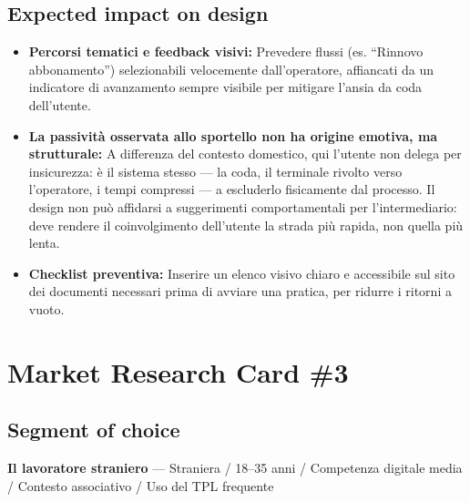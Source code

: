\documentclass[11pt,a4paper]{article}
\begin{document}
\subsection*{Expected impact on design}
\begin{tcolorbox}[colback=backgroundColor,colframe=borderColor,arc=2mm]

\begin{itemize}[leftmargin=*,itemsep=6pt]

     \item \textbf{Percorsi tematici e feedback visivi:} Prevedere flussi (es. ``Rinnovo abbonamento'') selezionabili velocemente dall'operatore, affiancati da un indicatore di avanzamento sempre visibile per mitigare l'ansia da coda dell'utente.

    \item \textbf{La passività osservata allo sportello non ha origine 
    emotiva, ma strutturale:} A differenza del contesto domestico, 
    qui l'utente non delega per insicurezza: è il sistema stesso --- la 
    coda, il terminale rivolto verso l'operatore, i tempi compressi --- 
    a escluderlo fisicamente dal processo. Il design non può affidarsi 
    a suggerimenti comportamentali per l'intermediario: deve rendere 
    il coinvolgimento dell'utente la strada più rapida, non quella più 
    lenta.

     \item \textbf{Checklist preventiva:} Inserire un elenco visivo chiaro e accessibile sul sito dei documenti necessari prima di avviare una pratica, per ridurre i ritorni a vuoto.

\end{itemize}
\end{tcolorbox}

\newpage
\section*{Market Research Card \#3}
\subsection*{Segment of choice}
\begin{tcolorbox}[colback=backgroundColor,colframe=borderColor,arc=2mm]
\textbf{Il lavoratore straniero} --- Straniera / 18--35 anni / Competenza digitale media / Contesto associativo / Uso del TPL frequente
\end{tcolorbox}
\end{document}
